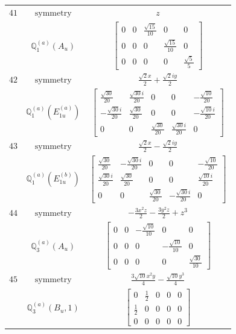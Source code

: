 \documentclass[fleqn,8pt,landscape]{jsarticle}
\begin{document}
\begin{longtable}{ccc}
$ 41 $ & $ \text{symmetry} $ & $ z $ \\
$  $ & $ \mathbb{Q}_{1}^{(a)}(A_{u}) $ & $ \begin{bmatrix} 0 & 0 & \frac{\sqrt{15}}{10} & 0 & 0 \\ 0 & 0 & 0 & \frac{\sqrt{15}}{10} & 0 \\ 0 & 0 & 0 & 0 & \frac{\sqrt{5}}{5} \end{bmatrix} $ \\ \hline
$ 42 $ & $ \text{symmetry} $ & $ \frac{\sqrt{2} x}{2} + \frac{\sqrt{2} i y}{2} $ \\
$  $ & $ \mathbb{Q}_{1}^{(a)}(E_{1u}^{(a)}) $ & $ \begin{bmatrix} \frac{\sqrt{30}}{20} & \frac{\sqrt{30} i}{20} & 0 & 0 & - \frac{\sqrt{10}}{20} \\ - \frac{\sqrt{30} i}{20} & \frac{\sqrt{30}}{20} & 0 & 0 & - \frac{\sqrt{10} i}{20} \\ 0 & 0 & \frac{\sqrt{30}}{20} & \frac{\sqrt{30} i}{20} & 0 \end{bmatrix} $ \\ \hline
$ 43 $ & $ \text{symmetry} $ & $ \frac{\sqrt{2} x}{2} - \frac{\sqrt{2} i y}{2} $ \\
$  $ & $ \mathbb{Q}_{1}^{(a)}(E_{1u}^{(b)}) $ & $ \begin{bmatrix} \frac{\sqrt{30}}{20} & - \frac{\sqrt{30} i}{20} & 0 & 0 & - \frac{\sqrt{10}}{20} \\ \frac{\sqrt{30} i}{20} & \frac{\sqrt{30}}{20} & 0 & 0 & \frac{\sqrt{10} i}{20} \\ 0 & 0 & \frac{\sqrt{30}}{20} & - \frac{\sqrt{30} i}{20} & 0 \end{bmatrix} $ \\ \hline
$ 44 $ & $ \text{symmetry} $ & $ - \frac{3 x^{2} z}{2} - \frac{3 y^{2} z}{2} + z^{3} $ \\
$  $ & $ \mathbb{Q}_{3}^{(a)}(A_{u}) $ & $ \begin{bmatrix} 0 & 0 & - \frac{\sqrt{10}}{10} & 0 & 0 \\ 0 & 0 & 0 & - \frac{\sqrt{10}}{10} & 0 \\ 0 & 0 & 0 & 0 & \frac{\sqrt{30}}{10} \end{bmatrix} $ \\ \hline
$ 45 $ & $ \text{symmetry} $ & $ \frac{3 \sqrt{10} x^{2} y}{4} - \frac{\sqrt{10} y^{3}}{4} $ \\
$  $ & $ \mathbb{Q}_{3}^{(a)}(B_{u},1) $ & $ \begin{bmatrix} 0 & \frac{1}{2} & 0 & 0 & 0 \\ \frac{1}{2} & 0 & 0 & 0 & 0 \\ 0 & 0 & 0 & 0 & 0 \end{bmatrix} $ \\ \hline

\end{longtable}
\end{document}

